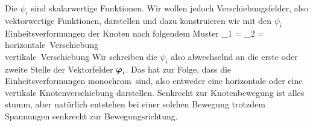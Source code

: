{Die $\psi_i$ sind skalarwertige Funktionen. Wir wollen jedoch Verschiebungsfelder, also vektorwertige Funktionen, darstellen und dazu konstruieren wir mit den $\psi_i$ Einheitsverformungen der Knoten nach folgendem Muster
\bfo
\vek \Np_1 =  \qquad  \vek \Np_2 =
 \qquad {} \leftarrow \quad \mbox{horizontale Verschiebung} \\
\leftarrow \quad \mbox{vertikale Verschiebung} \earr
\efo
Wir schreiben die $\psi_i$ also abwechselnd an die erste oder zweite Stelle der Vektorfelder $\mbox{\boldmath $\varphi$}_i$. Das hat zur Folge, dass die Einheitsverformungen \glq monochrom\grq\ sind, also entweder eine horizontale oder eine vertikale Knotenverschiebung darstellen. Senkrecht zur Knotenbewegung ist alles stumm, aber nat\"{u}rlich entstehen bei einer solchen Bewegung trotzdem Spannungen senkrecht zur Bewegungsrichtung.

}
